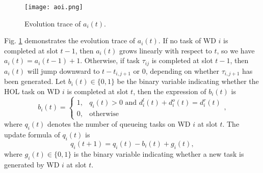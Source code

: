 \documentclass[lettersize, journal]{IEEEtran}
\begin{document}
\begin{figure}[!t]
    \centering
    \texttt{[image: aoi.png]}
    \caption{Evolution trace of $a_i(t)$.}
    \label{fig:aoi}
\end{figure}
Fig. \ref{fig:aoi} demonstrates the evolution trace of $a_i(t)$.
If no task of WD $i$ is completed at slot $t-1$, then $a_i(t)$ grows linearly with respect to $t$, so we have $a_i(t) = a_i(t-1) + 1$.
Otherwise, if task $\tau_{ij}$ is completed at slot $t-1$, then $a_i(t)$ will jump downward to $t-t_{i,j+1}$ or $0$, depending on whether $\tau_{i,j+1}$ has been generated.
Let $b_i(t) \in \{ 0,1 \}$ be the binary variable indicating whether the HOL task on WD $i$ is completed at slot $t$,
then the expression of $b_i(t)$ is
\begin{equation*}
    b_i(t) = 
    \begin{cases}
        1, &\text{$q_i(t) > 0$ and $d^l_i(t) + d^o_i(t) = d^r_i(t)$} \\
        0, &\text{otherwise}
    \end{cases},
\end{equation*}
where $q_i(t)$ denotes the number of queueing tasks on WD $i$ at slot $t$.
The update formula of $q_i(t)$ is 
\begin{equation}
    q_i(t+1) = q_i(t) - b_i(t) + g_i(t),
    \label{eq:update_q}
\end{equation}
where $g_i(t) \in \{ 0,1 \}$ is the binary variable indicating whether a new task is generated by WD $i$ at slot $t$.

\end{document}
